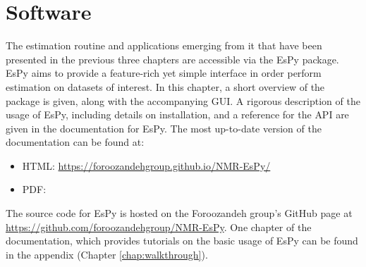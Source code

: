 \chapter{Software}
\label{chap:nmrespy}

The estimation routine and applications emerging from it that have been
presented in the previous three chapters are accessible via the \ac{EsPy}
package. \ac{EsPy} aims to provide a feature-rich yet simple interface in order
perform estimation on datasets of interest. In this chapter, a short
overview of the package is given, along with the accompanying \ac{GUI}.
A rigorous description of the usage of \ac{EsPy}, including details on
installation, and a reference for the \ac{API} are given in the documentation
for \ac{EsPy}. The most up-to-date version of the documentation can be found
at:
\begin{itemize}[leftmargin=0pt,label={}]
    \item HTML: \url{https://foroozandehgroup.github.io/NMR-EsPy/}
    \item PDF: 
\end{itemize}
The source code for \ac{EsPy} is hosted on the Foroozandeh group's GitHub page
at \url{https://github.com/foroozandehgroup/NMR-EsPy}.
One chapter of the documentation, which provides tutorials on the basic usage
of \ac{EsPy} can be found in the appendix (Chapter \ref{chap:walkthrough}).


